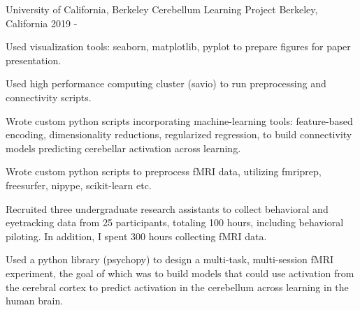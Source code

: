 

\begin{cventries}

  \cventry
    {University of California, Berkeley} %
    {Cerebellum Learning Project} %
    {Berkeley, California} %
    {2019 - } %
    {
      \begin{cvitems} %
        \item {Used visualization tools: seaborn, matplotlib, pyplot to prepare figures for paper presentation.}
        \item {Used high performance computing cluster (savio) to run preprocessing and connectivity scripts.}
        \item {Wrote custom python scripts incorporating machine-learning tools: feature-based encoding, dimensionality reductions, regularized regression, to build connectivity models predicting cerebellar activation across learning.}
        \item {Wrote custom python scripts to preprocess fMRI data, utilizing fmriprep, freesurfer, nipype, scikit-learn etc.}
        \item {Recruited three undergraduate research assistants to collect behavioral and eyetracking data from 25 participants, totaling 100 hours, including behavioral piloting. In addition, I spent 300 hours collecting fMRI data.}
        \item {Used a python library (psychopy) to design a multi-task, multi-session fMRI experiment, the goal of which was to build models that could use activation from the cerebral cortex to predict activation in the cerebellum across learning in the human brain.}
      \end{cvitems}
    }
    

\end{cventries}
